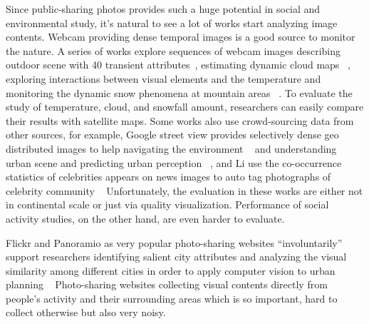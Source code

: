 Since public-sharing photos provides such a huge potential in social and environmental study, it's 
natural to see a lot of works start analyzing image contents. Webcam providing dense temporal images 
is a good source to monitor the nature. A series of works explore sequences 
of webcam images describing outdoor scene with 40 transient attributes~\cite{laffont2014transient}, estimating dynamic cloud maps ~\cite{murdock2015building, murdock}, exploring interactions between visual elements and the temperature 
and monitoring the dynamic snow phenomena at mountain areas ~\cite{fedorov2015snowwatch, fedorov2014snow}. 
To evaluate the study of temperature, cloud, and snowfall amount,
 researchers can easily compare their results with satellite maps. 
Some works also use crowd-sourcing data from other sources, for example, Google street view provides selectively dense geo distributed images to help navigating the environment ~\cite{khosla2014looking} and understanding urban scene and predicting urban perception ~\cite{porzi2015predicting}, and Li \etal use the co-occurrence statistics of celebrities appears on news images to auto tag photographs of celebrity community ~\cite{li2015celebritynet}
Unfortunately, 
the evaluation in these works are either not in continental scale or just via quality visualization.
Performance of social activity studies, on the other hand, are even harder to evaluate.

Flickr and Panoramio as very popular photo-sharing websites 
``involuntarily'' support researchers identifying salient city attributes and analyzing the visual similarity among different cities in order to apply computer vision to urban planning ~\cite{zhou2014recognizing}
Photo-sharing websites collecting visual contents directly from people's activity and their surrounding areas which is so important, hard to collect otherwise but also very noisy. 


